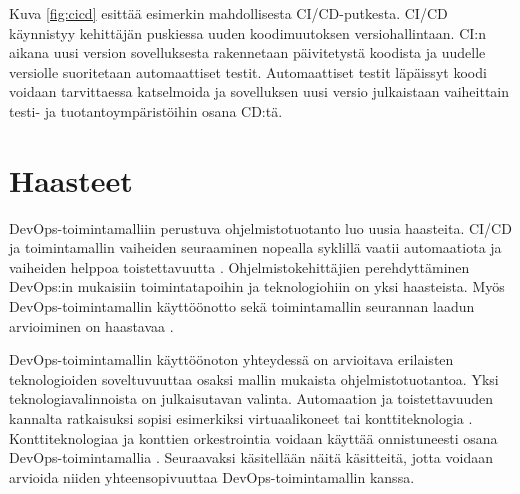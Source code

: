 Kuva \ref{fig:cicd} esittää esimerkin mahdollisesta CI/CD-putkesta. CI/CD käynnistyy kehittäjän puskiessa uuden koodimuutoksen versiohallintaan.
CI:n aikana uusi version sovelluksesta rakennetaan päivitetystä koodista ja uudelle versiolle suoritetaan automaattiset testit.
Automaattiset testit läpäissyt koodi voidaan tarvittaessa katselmoida ja sovelluksen uusi versio julkaistaan vaiheittain testi- ja tuotantoympäristöihin osana CD:tä.

\section{Haasteet}

DevOps-toimintamalliin perustuva ohjelmistotuotanto luo uusia haasteita.
CI/CD ja toimintamallin vaiheiden seuraaminen nopealla syklillä vaatii automaatiota ja vaiheiden helppoa toistettavuutta \cite{Jabbari16, Leite19}.
Ohjelmistokehittäjien perehdyttäminen DevOps:in mukaisiin toimintatapoihin ja teknologiohiin on yksi haasteista.
Myös DevOps-toimintamallin käyttöönotto sekä toimintamallin seurannan laadun arvioiminen on haastavaa \cite{Leite19}.


DevOps-toimintamallin käyttöönoton yhteydessä on arvioitava erilaisten teknologioiden soveltuvuuttaa osaksi mallin mukaista ohjelmistotuotantoa.
Yksi teknologiavalinnoista on julkaisutavan valinta.
Automaation ja toistettavuuden kannalta ratkaisuksi sopisi esimerkiksi virtuaalikoneet tai konttiteknologia \cite{Dua14}.
Konttiteknologiaa ja konttien orkestrointia voidaan käyttää onnistuneesti osana DevOps-toimintamallia \cite{Kang16}.
Seuraavaksi käsitellään näitä käsitteitä, jotta voidaan arvioida niiden yhteensopivuuttaa DevOps-toimintamallin kanssa.
